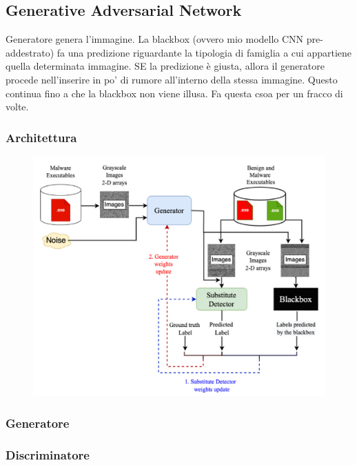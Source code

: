 \newpage
\subsection{Generative Adversarial Network}
Generatore genera l'immagine. La blackbox (ovvero mio modello CNN pre-addestrato) fa una predizione riguardante la tipologia di famiglia a cui appartiene quella determinata immagine. SE la predizione è giusta, allora il generatore procede nell'inserire in po' di rumore all'interno della stessa immagine. Questo continua fino a che la blackbox non viene illusa. Fa questa csoa per un fracco di volte.
\subsubsection{Architettura}
\begin{figure}[ht]
    \centering
        \centering
        \includegraphics[width=0.8\linewidth]{images/GAN_architecture.png}
        \label{fig:gan_architecture}
\end{figure}

\subsubsection{Generatore}

\subsubsection{Discriminatore}

